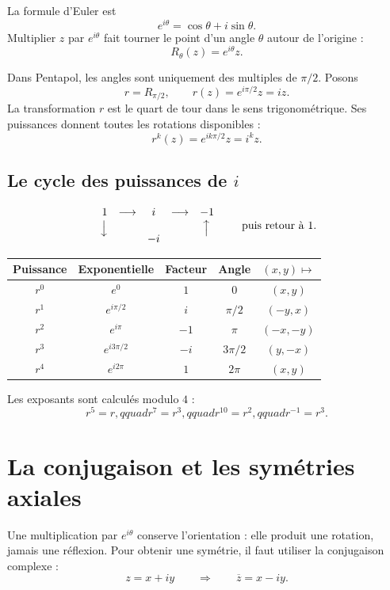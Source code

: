 \documentclass[11pt,a4paper]{article}
\newcommand{\conj}[1]{\overline{#1}}
\begin{document}
La formule d'Euler est
\[
  e^{i\theta}=\cos\theta+i\sin\theta.
\]
Multiplier $z$ par $e^{i\theta}$ fait tourner le point d'un angle $\theta$ autour de l'origine :
\[
  R_{\theta}(z)=e^{i\theta}z.
\]

Dans Pentapol, les angles sont uniquement des multiples de $\pi/2$. Posons
\[
  r=R_{\pi/2},
  \qquad r(z)=e^{i\pi/2}z=iz.
\]
La transformation $r$ est le quart de tour dans le sens trigonom\'etrique. Ses puissances donnent
toutes les rotations disponibles :
\[
  r^k(z)=e^{ik\pi/2}z=i^kz.
\]

\subsection*{Le cycle des puissances de $i$}

\[
\begin{array}{ccccc}
1 & \longrightarrow & i & \longrightarrow & -1\\
\rotatebox[origin=c]{90}{$\longleftarrow$} &&&& \rotatebox[origin=c]{90}{$\longrightarrow$}\\[-0.4em]
&& -i &&
\end{array}
\qquad\text{puis retour \`a }1.
\]

\begin{center}
\begin{tabular}{ccccc}
\toprule
Puissance & Exponentielle & Facteur & Angle & $(x,y)\mapsto$\\
\midrule
$r^0$ & $e^{0}$ & $1$ & $0$ & $(x,y)$\\
$r^1$ & $e^{i\pi/2}$ & $i$ & $\pi/2$ & $(-y,x)$\\
$r^2$ & $e^{i\pi}$ & $-1$ & $\pi$ & $(-x,-y)$\\
$r^3$ & $e^{i3\pi/2}$ & $-i$ & $3\pi/2$ & $(y,-x)$\\
$r^4$ & $e^{i2\pi}$ & $1$ & $2\pi$ & $(x,y)$\\
\bottomrule
\end{tabular}
\end{center}

Les exposants sont calcul\'es modulo $4$ :
\[
  r^5=r,qquad r^7=r^3,qquad r^{10}=r^2,qquad r^{-1}=r^3.
\]

\section{La conjugaison et les sym\'etries axiales}

Une multiplication par $e^{i\theta}$ conserve l'orientation : elle produit une rotation, jamais
une r\'eflexion. Pour obtenir une sym\'etrie, il faut utiliser la conjugaison complexe :
\[
  z=x+iy
  \qquad\Longrightarrow\qquad
  \conj z=x-iy.
\]
\end{document}
